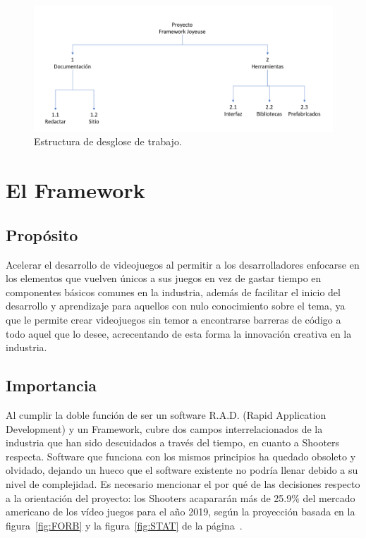 \documentclass[]{article}
\begin{document}
\begin{figure}[H]
	
	\centering
	\includegraphics[width=1\textwidth]{EDT}
	\caption{Estructura de desglose de trabajo.} 
	\label{EDT}
	
\end{figure}


\section{El Framework}


\subsection{Prop\'osito}

Acelerar el desarrollo 
de videojuegos al permitir a los desarrolladores 
enfocarse en los elementos que vuelven \'unicos a sus
juegos en vez de gastar tiempo en componentes b\'asicos comunes en la industria, adem\'as de facilitar el inicio del desarrollo y aprendizaje para aquellos con nulo conocimiento sobre el tema, ya que le permite crear videojuegos sin temor a encontrarse barreras de c\'odigo a todo aquel que lo desee, acrecentando de esta forma la innovaci\'on creativa en la industria.

\subsection{Importancia}

Al cumplir la doble funci\'on de ser un software R.A.D. (Rapid Application Development) y un Framework, cubre dos campos interrelacionados de la industria que han sido descuidados a trav\'es del tiempo, en cuanto a Shooters respecta. 
Software que funciona con los mismos principios ha quedado obsoleto y olvidado, dejando un hueco que el software existente no podr\'ia llenar debido a su nivel de complejidad.
\newline
Es necesario mencionar el por qu\'e de las decisiones respecto a la orientaci\'on del proyecto: los Shooters acaparar\'an m\'as de 25.9\% del  mercado americano de los v\'ideo juegos para el a\~no 2019, seg\'un la proyecci\'on basada en la figura~\ref{fig:FORB}  y la figura~\ref{fig:STAT} de la p\'agina~\pageref{fig:STAT}.
\end{document}
